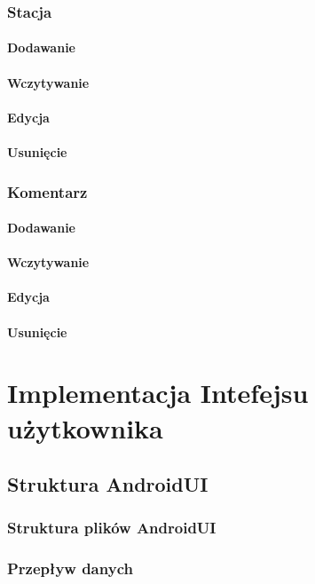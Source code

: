 \subsubsection{Stacja}
\paragraph{Dodawanie}
\paragraph{Wczytywanie}
\paragraph{Edycja}
\paragraph{Usunięcie}
\subsubsection{Komentarz}
\paragraph{Dodawanie}
\paragraph{Wczytywanie}
\paragraph{Edycja}
\paragraph{Usunięcie}
%
\section{Implementacja Intefejsu użytkownika}
\subsection{Struktura AndroidUI}
\subsubsection{Struktura plików AndroidUI}
\subsubsection{Przepływ danych}
